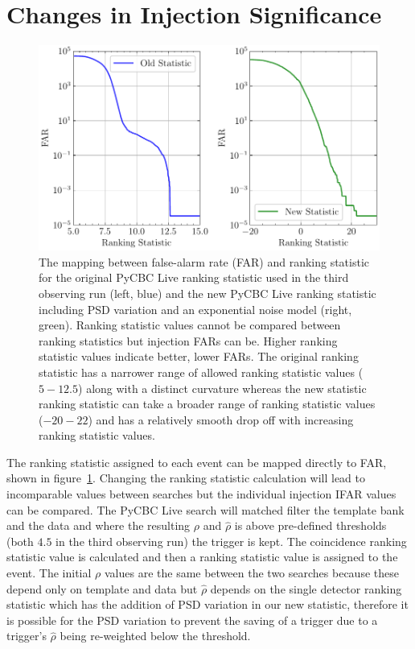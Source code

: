 \section{\label{5:sec:injection-investigations}Changes in Injection Significance}


\begin{figure}
      \centering
    \includegraphics[width=1.0\textwidth]{images/5_pycbclive/fits-psd/fits_psd_far_vs_stat.pdf}
    \caption{The mapping between false-alarm rate (FAR) and ranking statistic for the original PyCBC Live ranking statistic used in the third observing run (left, blue) and the new PyCBC Live ranking statistic including PSD variation and an exponential noise model (right, green). Ranking statistic values cannot be compared between ranking statistics but injection FARs can be. Higher ranking statistic values indicate better, lower FARs. The original ranking statistic has a narrower range of allowed ranking statistic values ($5 - 12.5$) along with a distinct curvature whereas the new statistic ranking statistic can take a broader range of ranking statistic values ($-20-22$) and has a relatively smooth drop off with increasing ranking statistic values.}
    \label{5:fig:fits-psdvar-far-stat}
\end{figure}
%
The ranking statistic assigned to each event can be mapped directly to FAR, shown in figure~\ref{5:fig:fits-psdvar-far-stat}. Changing the ranking statistic calculation will lead to incomparable values between searches but the individual injection IFAR values can be compared. The PyCBC Live search will matched filter the template bank and the data and where the resulting $\rho$ and $\hat{\rho}$ is above pre-defined thresholds (both $4.5$ in the third observing run) the trigger is kept. The coincidence ranking statistic value is calculated and then a ranking statistic value is assigned to the event. The initial $\rho$ values are the same between the two searches because these depend only on template and data but $\hat{\rho}$ depends on the single detector ranking statistic which has the addition of PSD variation in our new statistic, therefore it is possible for the PSD variation to prevent the saving of a trigger due to a trigger's $\hat{\rho}$ being re-weighted below the threshold.

